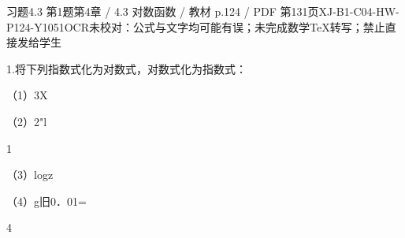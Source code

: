 \begin{bankitem}{习题4.3 第1题}{第4章 / 4.3 对数函数 / 教材 p.124 / PDF 第131页}{XJ-B1-C04-HW-P124-Y1051}{OCR未校对：公式与文字均可能有误；未完成数学TeX转写；禁止直接发给学生}
\begin{ocrdraft}
\par
1.将下列指数式化为对数式，对数式化为指数式：
\par
（1）3X
\par
（2）2"l
\par
1
\par
（3）logz
\par
（4）g旧0．01=
\par
4
\end{ocrdraft}
\end{bankitem}
